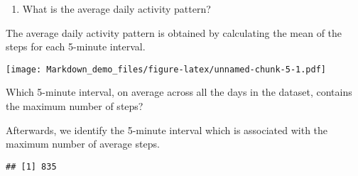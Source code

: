 \documentclass[]{article}
\newenvironment{Shaded}{\begin{snugshade}}{\end{snugshade}}
\newcommand{\KeywordTok}[1]{\textcolor[rgb]{0.13,0.29,0.53}{\textbf{#1}}}
\newcommand{\DataTypeTok}[1]{\textcolor[rgb]{0.13,0.29,0.53}{#1}}
\newcommand{\DecValTok}[1]{\textcolor[rgb]{0.00,0.00,0.81}{#1}}
\newcommand{\StringTok}[1]{\textcolor[rgb]{0.31,0.60,0.02}{#1}}
\newcommand{\OperatorTok}[1]{\textcolor[rgb]{0.81,0.36,0.00}{\textbf{#1}}}
\newcommand{\NormalTok}[1]{#1}
\providecommand{\tightlist}{%
  \setlength{\itemsep}{0pt}\setlength{\parskip}{0pt}}
\begin{document}
\begin{enumerate}
\def\labelenumi{\arabic{enumi})}
\setcounter{enumi}{2}
\tightlist
\item
  What is the average daily activity pattern?
\end{enumerate}

The average daily activity pattern is obtained by calculating the mean
of the steps for each 5-minute interval.

\begin{Shaded}
\end{Shaded}

\texttt{[image: Markdown\_demo\_files/figure-latex/unnamed-chunk-5-1.pdf]}

Which 5-minute interval, on average across all the days in the dataset,
contains the maximum number of steps?

Afterwards, we identify the 5-minute interval which is associated with
the maximum number of average steps.

\begin{Shaded}
\end{Shaded}

\begin{verbatim}
## [1] 835
\end{verbatim}
\end{document}
